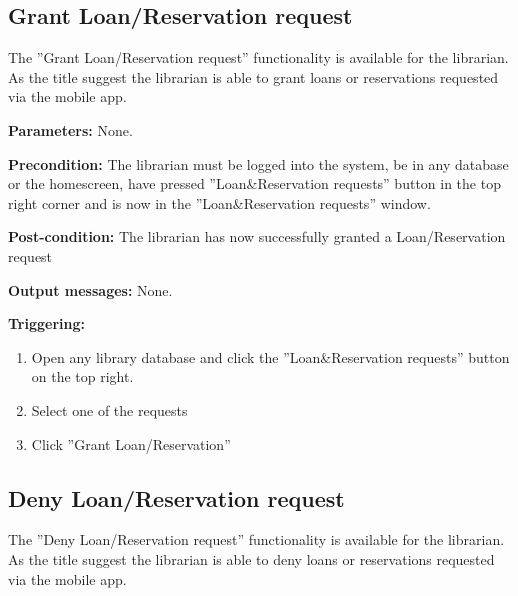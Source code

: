 \subsection{Grant Loan/Reservation request}

The ''Grant Loan/Reservation request'' functionality is available for the
librarian.
As the title suggest the librarian is able to grant loans or reservations
requested via the mobile app.

\begin{description}

\item \textbf{Parameters:} None.

\item \textbf{Precondition:} The librarian must be logged into the system, be in
any database or the homescreen, have pressed ''Loan\&Reservation requests''
button in the top right corner and is now in the ''Loan\&Reservation requests''
window.

\item \textbf{Post-condition:} The librarian has now successfully granted a
Loan/Reservation request

\item \textbf{Output messages:} None.

\item \textbf{Triggering:}
\begin{enumerate}
\item Open any library database and click the ''Loan\&Reservation requests''
button on the top right.
\item Select one of the requests
\item Click ''Grant Loan/Reservation''
\end{enumerate}

\end{description}

\subsection{Deny Loan/Reservation request}

The ''Deny Loan/Reservation request'' functionality is available for the
librarian.
As the title suggest the librarian is able to deny loans or reservations
requested via the mobile app.

